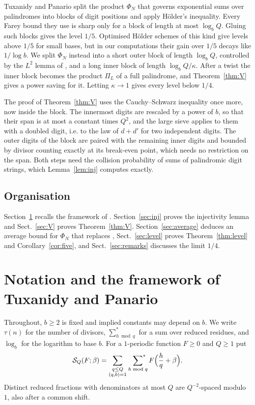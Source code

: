 \documentclass[11pt]{amsart}
\theoremstyle{definition}
\numberwithin{equation}{section}
\newcommand{\sumstar}{\sideset{}{^*}\sum}
\newcommand{\FS}{\mathcal{S}}
\begin{document}
Tuxanidy and Panario split the product $\Phi_N$ that governs exponential sums over palindromes into blocks of digit positions and apply H\"older's inequality. Every Farey bound they use is sharp only for a block of length at most $\log_bQ$. Gluing such blocks gives the level $1/5$. Optimised H\"older schemes of this kind give levels above $1/5$ for small bases, but in our computations their gain over $1/5$ decays like $1/\log b$. We split $\Phi_N$ instead into a short outer block of length $\log_bQ$, controlled by the $L^2$ lemma of \cite{TP}, and a long inner block of length $\log_bQ/\kappa$. After a twist the inner block becomes the product $\Pi_L$ of a full palindrome, and Theorem~\ref{thm:V} gives a power saving for it. Letting $\kappa\to1$ gives every level below $1/4$.

The proof of Theorem~\ref{thm:V} uses the Cauchy--Schwarz inequality once more, now inside the block. The innermost digits are rescaled by a power of $b$, so that their span is at most a constant times $Q^2$, and the large sieve applies to them with a doubled digit, i.e. to the law of $d+d'$ for two independent digits. The outer digits of the block are paired with the remaining inner digits and bounded by divisor counting exactly at its break-even point, which needs no restriction on the span. Both steps need the collision probability of sums of palindromic digit strings, which Lemma~\ref{lem:inj} computes exactly.

\subsection{Organisation}

Section~\ref{sec:framework} recalls the framework of \cite{TP}. Section~\ref{sec:inj} proves the injectivity lemma and Sect.~\ref{sec:V} proves Theorem~\ref{thm:V}. Section~\ref{sec:average} deduces an average bound for $\Phi_N$ that replaces \cite[Prop.~8.1]{TP}, Sect.~\ref{sec:level} proves Theorem~\ref{thm:level} and Corollary~\ref{cor:five}, and Sect.~\ref{sec:remarks} discusses the limit $1/4$.

\section{Notation and the framework of Tuxanidy and Panario}\label{sec:framework}

Throughout, $b\ge2$ is fixed and implied constants may depend on $b$. We write $\tau(n)$ for the number of divisors, $\sum^*_{h\bmod q}$ for a sum over reduced residues, and $\log_b$ for the logarithm to base $b$. For a $1$-periodic function $F\ge0$ and $Q\ge1$ put
\[
\FS_Q(F;\beta)=\sum_{\substack{q\le Q\\(q,b)=1}}\ \sumstar_{h\bmod q}F\Bigl(\frac hq+\beta\Bigr).
\]
Distinct reduced fractions with denominators at most $Q$ are $Q^{-2}$-spaced modulo $1$, also after a common shift.
\end{document}
